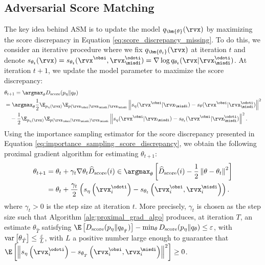 \subsection{Adversarial Score Matching}
The key idea behind ASM is to update the model $q_{\bm{\theta}}(\rvx)$ by maximizing the score discrepancy in Equation \eqref{eq:score_discrepancy_missing}. To do this, we consider an iterative procedure where we fix $q_{\bm{\theta_{t}}}(\rvx)$ at iteration $t$ and denote $s_{\theta_{t}}(\rvx) = s_{\theta_{t}}(\rvx^{\obsi}, \rvx_{\misdi}^{\odoti}) = \nabla \log q_{\theta_{t}}(\rvx | \rvx_{\misdi}^{\odoti})$. At iteration $t+1$, we update the model parameter to maximize the score discrepancy:
\begin{align}
	&\theta_{t+1} = \argmax_{\theta} D_{\text{score}}(p_{\eta} \| q_{\theta} ) \nonumber \\ 
	&= \argmax_{\theta} \frac{1}{2} \E_{p_{\eta}(\rvx)} \E_{p(\rvx_{\obsi} | \rvx_{\misdi}) \rvx_{\misdi}} \left\| s_{\eta}(\rvx^{\obsi} | \rvx_{\misdi}) - s_{\theta} (\rvx^{\obsi} | \rvx_{\misdi}^{\odoti}) \right\|^{2} \notag \\
	& \quad - \frac{1}{2} \E_{p_{\eta}(\rvx)} \E_{p(\rvx_{\obsi} | \rvx_{\misdi}) \rvx_{\misdi}} \left\| s_{\eta}(\rvx^{\obsi} | \rvx_{\misdi}) - s_{\theta_{t}}(\rvx^{\obsi} | \rvx_{\misdi}^{\odoti}) \right\|^{2}. \label{eq:update_eq}
\end{align}
Using the importance sampling estimator for the score discrepancy presented in Equation \eqref{eq:importance_sampling_score_discrepancy}, we obtain the following proximal gradient algorithm \citep{Beck2017} for estimating $\theta_{t+1}$:
\begin{align}
	\theta_{t+1} &= \theta_{t} + \gamma_{t} \nabla \theta_{t} \widehat{D}_{\text{score}}(i) \in \argmax_{\theta} \left[ \widehat{D}_{\text{score}}(i) - \frac{1}{2} \left\| \theta - \theta_{t} \right\|^{2} \right] \notag \\
	&= \theta_{t} + \frac{\gamma_{t}}{2} \left( s_{\eta}\left(\rvx_{i}^{\odoti} \right) - s_{\theta_{t}} \left( \rvx_{i}^{\obsi}, \rvx_{i}^{\misdi} \right) \right). \label{eq:proximal_gradient_algo}
\end{align}
where $\gamma_{t}>0$ is the step size at iteration $t$. More precisely, $\gamma_{t}$ is chosen as the step size such that Algorithm \ref{alg:proximal_grad_algo} produces, at iteration $T$, an estimate $\theta_{\hat{T}}$ satisfying $\E \left[ D_{\text{score}}(p_{\eta} \| q_{\theta_{\hat{T}}}) \right] - \min_{\theta} D_{\text{score}}(p_{\eta} \| q_{\theta}) \leq \varepsilon$, with $\text{\rm{var}}\left[\theta_{\hat{T}}\right] \leq \frac{\varepsilon}{L}$, with $L$ a positive number large enough to guarantee that $\E \left[ \left\| s_{\eta} \left( \rvx_{i}^{\odoti} \right) - s_{\theta_{\hat{T}}} \left( \rvx_{i}^{\obsi}, \rvx_{i}^{\misdi} \right) \right\|^{2} \right] \geq 0$.

